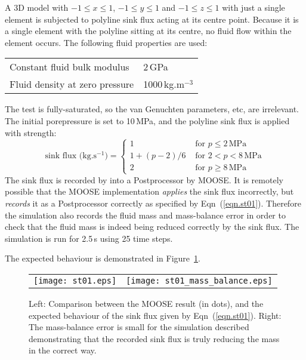 \documentclass[]{scrreprt}
\begin{document}
A 3D model with $-1\leq x \leq 1$, $-1\leq y \leq 1$ and $-1\leq z
\leq 1$ with just a
single element is subjected to polyline sink flux acting at its
centre point.  Because it is a single element with the polyline
sitting at its centre, no fluid flow within the
element occurs.  The following fluid properties are used:
\begin{center}
\begin{tabular}{|ll|}
\hline
Constant fluid bulk modulus & 2\,GPa \\
Fluid density at zero pressure & 1000\,kg.m$^{-3}$ \\
\hline
\end{tabular}
\end{center}
The test is fully-saturated, so the van Genuchten parameters, etc, are
irrelevant.  The initial porepressure is set to 10\,MPa, and the
polyline sink flux is applied with strength:
\begin{equation}
\mbox{sink flux (kg.s$^{-1}$)} = \left\{
\begin{array}{ll}
1 & \mbox{ for } p \leq 2\,\mbox{MPa} \\
1 + (p - 2)/6 & \mbox{ for } 2<p<8\,\mbox{MPa} \\
2 & \mbox{ for } p\geq 8\,\mbox{MPa}
\end{array}
\right.
\label{eqn.st01}
\end{equation}
The sink flux is recorded by into a Postprocessor by MOOSE.  It is
remotely possible that the MOOSE implementation {\em applies} the sink
flux incorrectly, but {\em records} it as a Postprocessor correctly as
specified by Eqn~(\ref{eqn.st01}).  Therefore the simulation also
records the fluid mass and mass-balance error in order to check that
the fluid mass is indeed being reduced correctly by the sink flux.
The simulation is run for 2.5\,s using 25 time steps.

The expected behaviour is demonstrated in Figure~\ref{st01.fig}.

\begin{figure}[htb]
\centering
\begin{tabular}{cc}
\texttt{[image: st01.eps]} &
\texttt{[image: st01\_mass\_balance.eps]}
\end{tabular}
\caption{Left: Comparison between the MOOSE result (in dots), and the
  expected behaviour of the sink flux given by Eqn~(\ref{eqn.st01}).
  Right: The mass-balance error is small for the simulation described
  demonstrating that the recorded sink flux is truly reducing the mass
  in the correct way.}
\label{st01.fig}
\end{figure}
\end{document}
